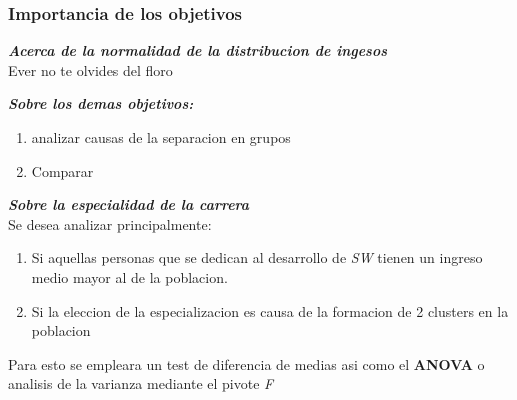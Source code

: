 \documentclass{beamer}
\begin{document}


\frametitle{Importancia de los objetivos}
\begin{frame}
  \textbf{\textit{
    Acerca de la normalidad de la distribucion de ingesos
  }} \\
  \alert{Ever no te olvides del floro}
\end{frame}

\begin{frame}
  \textbf{\textit{
    Sobre los demas objetivos:
  }}
  \\

  \begin{enumerate}
      \item analizar causas de la separacion en grupos
      \item Comparar

  \end{enumerate}

\end{frame}

\begin{frame}
  \textit{\textbf{
    Sobre la especialidad de la carrera
  }}
  \\

  Se desea analizar principalmente:
  \begin{enumerate}
      \item Si aquellas personas que se dedican al desarrollo
        de \textit{SW} tienen un ingreso medio mayor al de la
        poblacion.

      \item Si la eleccion de la especializacion es causa de la
        formacion de 2 clusters en la poblacion
  \end{enumerate}

  Para esto se empleara un test de diferencia de medias asi como
  el \textbf{ANOVA} o analisis de la varianza mediante el pivote
  \textit{F}

\end{frame}
\end{document}
